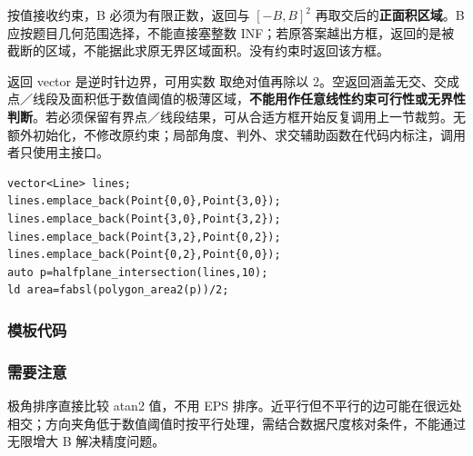  按值接收约束，B 必须为有限正数，返回与 $[-B,B]^2$ 再取交后的\textbf{正面积区域}。B 应按题目几何范围选择，不能直接塞整数 INF；若原答案越出方框，返回的是被截断的区域，不能据此求原无界区域面积。没有约束时返回该方框。

返回 vector 是逆时针边界，可用实数  取绝对值再除以 2。空返回涵盖无交、交成点／线段及面积低于数值阈值的极薄区域，\textbf{不能用作任意线性约束可行性或无界性判断}。若必须保留有界点／线段结果，可从合适方框开始反复调用上一节裁剪。无额外初始化，不修改原约束；局部角度、判外、求交辅助函数在代码内标注，调用者只使用主接口。
\begin{lstlisting}[style=mtycpp,numbers=none]
vector<Line> lines;
lines.emplace_back(Point{0,0},Point{3,0});
lines.emplace_back(Point{3,0},Point{3,2});
lines.emplace_back(Point{3,2},Point{0,2});
lines.emplace_back(Point{0,2},Point{0,0});
auto p=halfplane_intersection(lines,10);
ld area=fabsl(polygon_area2(p))/2;
\end{lstlisting}
\subsubsection*{模板代码}
\subsubsection*{需要注意}
极角排序直接比较 atan2 值，不用 EPS 排序。近平行但不平行的边可能在很远处相交；方向夹角低于数值阈值时按平行处理，需结合数据尺度核对条件，不能通过无限增大 B 解决精度问题。
